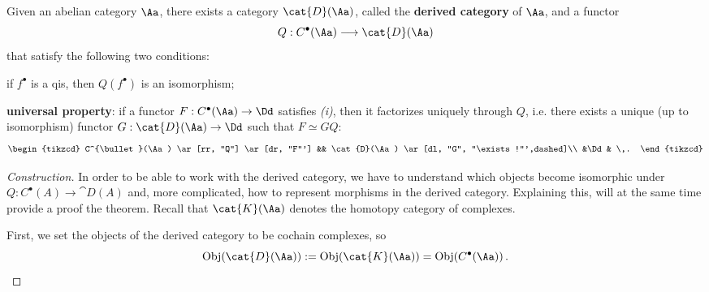 \begin{thmdef}
    Given an abelian category $\Aa$,
    there exists a category $\cat{D}(\Aa)$,
    called the \textbf{derived category} of $\Aa$,
    and a functor
    \begin{equation*}
        Q : C^{\bullet}(\Aa) \longrightarrow \cat{D}(\Aa)
    \end{equation*}
    that satisfy the following two conditions:
    \begin{rmnumerate}
        \item if $f^{\bullet}$ is a qis, 
        then $Q(f^{\bullet})$ is an isomorphism;

        \item \textbf{universal property}:
        if a functor $F:C^{\bullet}(\Aa) \to \Dd$
        satisfies \emph{(i)}, then it factorizes uniquely through $Q$,
        i.e. there exists a unique (up to isomorphism) functor 
        $G:\cat{D}(\Aa) \to \Dd$ such that $F \simeq GQ$:
        \begin{equation*}
            \begin{tikzcd}
                C^{\bullet}(\Aa) \ar[rr, "Q"] \ar[dr, "F"']
                && \cat{D}(\Aa) \ar[dl, "G", "\exists !"',dashed]\\
                &\Dd & \,.
            \end{tikzcd}
        \end{equation*}
    \end{rmnumerate}
    \begin{proof}[Construction]       
In order to be able to work with the derived category, 
we have to understand which objects become isomorphic under 
$Q : C^{\bullet}(A) \to \cat{D}(A)$ and, more complicated, 
how to represent morphisms in the derived category. 
Explaining this, will at the same time 
provide a proof the theorem. 
Recall that $\cat{K}(\Aa)$ denotes the homotopy category of complexes.

        First, we set the objects of the derived category to be
        cochain complexes, so
            \begin{equation*}
                \textrm{Obj}(\cat{D}(\Aa)) := \textrm{Obj}(\cat{K}(\Aa)) 
                = \textrm{Obj}(C^{\bullet}(\Aa))\,.
            \end{equation*}


\end{proof}
\end{thmdef}
